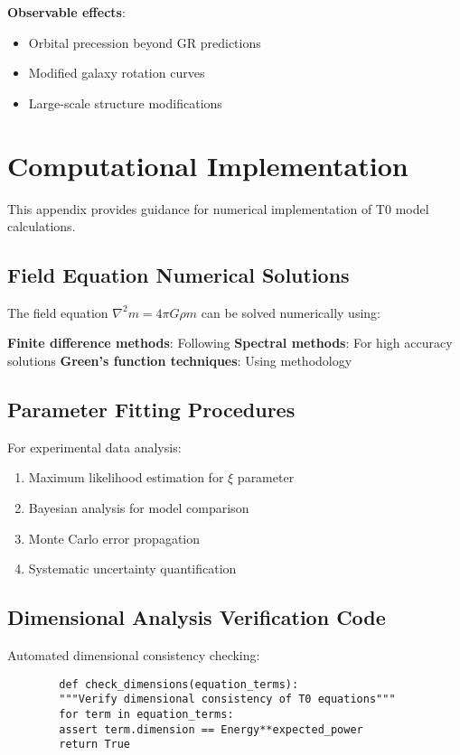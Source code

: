 \documentclass[12pt,a4paper]{article}
\begin{document}
	\textbf{Observable effects}:
	\begin{itemize}
		\item Orbital precession beyond GR predictions
		\item Modified galaxy rotation curves
		\item Large-scale structure modifications
	\end{itemize}
	
	\section{Computational Implementation}
	\label{app:computational}
	
	This appendix provides guidance for numerical implementation of T0 model calculations.
	
	\subsection{Field Equation Numerical Solutions}
	\label{app:numerical_solutions}
	
	The field equation $\nabla^2 m = 4\pi G \rho m$ can be solved numerically using:
	
	\textbf{Finite difference methods}: Following \citet{haberman2004}
	\textbf{Spectral methods}: For high accuracy solutions
	\textbf{Green's function techniques}: Using \citet{duffy2001} methodology
	
	\subsection{Parameter Fitting Procedures}
	\label{app:parameter_fitting}
	
	For experimental data analysis:
	\begin{enumerate}
		\item Maximum likelihood estimation for $\xi$ parameter
		\item Bayesian analysis for model comparison
		\item Monte Carlo error propagation
		\item Systematic uncertainty quantification
	\end{enumerate}
	
	\subsection{Dimensional Analysis Verification Code}
	\label{app:dimensional_code}
	
	Automated dimensional consistency checking:
	\begin{verbatim}
		def check_dimensions(equation_terms):
		"""Verify dimensional consistency of T0 equations"""
		for term in equation_terms:
		assert term.dimension == Energy**expected_power
		return True
	\end{verbatim}
	
\end{document}
